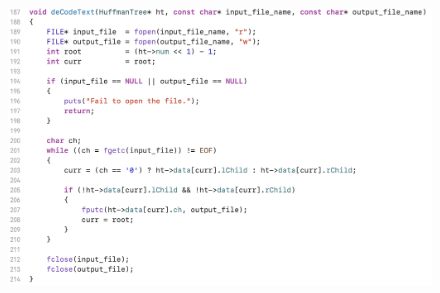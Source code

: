 \begin{itemize}
                    \begin{figure}[htbp]
                        \hspace*{1.2cm}
                        \includegraphics*[width = 12cm]{s1_5.png}
                    \end{figure}
                \end{itemize}
        \newpage
